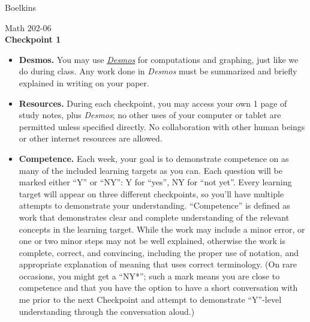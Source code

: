 \documentclass[11 pt]{article}
\begin{document}
 \hfill Boelkins \\
 
\begin{center}
Math 202-06 \\
{\bf Checkpoint 1}
\end{center}



\begin{itemize}
	
	\item {\bf Desmos.} You may use \href{https://www.desmos.com/calculator}{\emph{Desmos}} for computations and graphing, just like we do during class.  Any work done in \emph{Desmos} must be summarized and briefly explained in writing on your paper.  
	
	\item {\bf Resources.} During each checkpoint, you may access your own 1 page of study notes, plus \emph{Desmos}; no other uses of your computer or tablet are permitted unless specified directly.  No collaboration with other human beings or other internet resources are allowed.
	
	
	\item {\bf Competence.} Each week, your goal is to demonstrate competence on as many of the included learning targets as you can.  Each question will be marked either ``Y'' or ``NY'': Y for ``yes'', NY for ``not yet''.  Every learning target will appear on three different checkpoints, so you'll have multiple attempts to demonstrate your understanding.  ``Competence'' is defined as work that demonstrates clear and complete understanding of the relevant concepts in the learning target. While the work may include a minor error, or one or two minor steps may not be well explained, otherwise the work is complete, correct, and convincing, including the proper use of notation, and appropriate explanation of meaning that uses correct terminology.  (On rare occasions, you might get a ``NY*''; such a mark means you are close to competence and that you have the option to have a short conversation with me prior to the next Checkpoint and attempt to demonstrate ``Y''-level understanding through the conversation aloud.)	
\end{itemize}

\noindent \hrulefill \\
\end{document}
